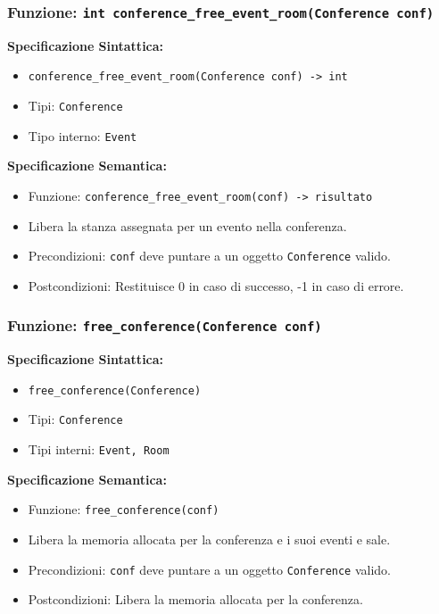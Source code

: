 \documentclass[11pt]{scrartcl} %
\begin{document}
\subsubsection{Funzione: \texttt{int conference\_free\_event\_room(Conference conf)}}

\textbf{Specificazione Sintattica:}
\begin{itemize}
\item \texttt{conference\_free\_event\_room(Conference conf) -> int}
\item Tipi: \texttt{Conference}
\item Tipo interno: \texttt{Event}
\end{itemize}

\textbf{Specificazione Semantica:}
\begin{itemize}
\item Funzione: \texttt{conference\_free\_event\_room(conf) -> risultato}
\item Libera la stanza assegnata per un evento nella conferenza.
\item Precondizioni: \texttt{conf} deve puntare a un oggetto \texttt{Conference} valido.
\item Postcondizioni: Restituisce 0 in caso di successo, -1 in caso di errore.
\end{itemize}

\subsubsection{Funzione: \texttt{free\_conference(Conference conf)}}

\textbf{Specificazione Sintattica:}
\begin{itemize}
\item \texttt{free\_conference(Conference)}
\item Tipi: \texttt{Conference}
\item Tipi interni: \texttt{Event, Room}
\end{itemize}

\textbf{Specificazione Semantica:}
\begin{itemize}
\item Funzione: \texttt{free\_conference(conf)}
\item Libera la memoria allocata per la conferenza e i suoi eventi e sale.
\item Precondizioni: \texttt{conf} deve puntare a un oggetto \texttt{Conference} valido.
\item Postcondizioni: Libera la memoria allocata per la conferenza.
\end{itemize}
\end{document}
